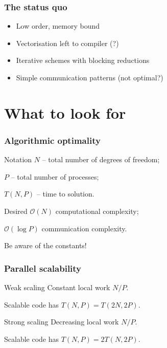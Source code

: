 \documentclass[presentation]{beamer}
\newcommand{\xmark}{\ding{55}}
\begin{document}
\begin{frame}
  \frametitle{The status quo}
  \begin{itemize}
  \item[\xmark] Low order, memory bound
  \item[\xmark] Vectorisation left to compiler (?)
  \item[\xmark] Iterative schemes with blocking reductions
  \item[\xmark] Simple communication patterns (not optimal?)
  \end{itemize}
\end{frame}


\section{What to look for}

\begin{frame}
  \frametitle{Algorithmic optimality}
  \begin{block}{Notation}
  $N$ -- total number of degrees of freedom;

  $P$ -- total number of processes;

  $T(N, P)$ -- time to solution.
  \end{block}

  \begin{block}{Desired}
    $\mathcal{O}(N)$ computational complexity;

    $\mathcal{O}(\log P)$ communication complexity.

    Be aware of the constants!
  \end{block}
\end{frame}

\begin{frame}
  \frametitle{Parallel scalability}

  \begin{block}{Weak scaling}
    Constant local work $N/P$.

    Scalable code has $T(N, P) = T(2N, 2P)$.
  \end{block}

  \begin{block}{Strong scaling}
    Decreasing local work $N/P$.

    Scalable code has $T(N, P) = 2T(N, 2P)$.
  \end{block}

\end{frame}
\end{document}
